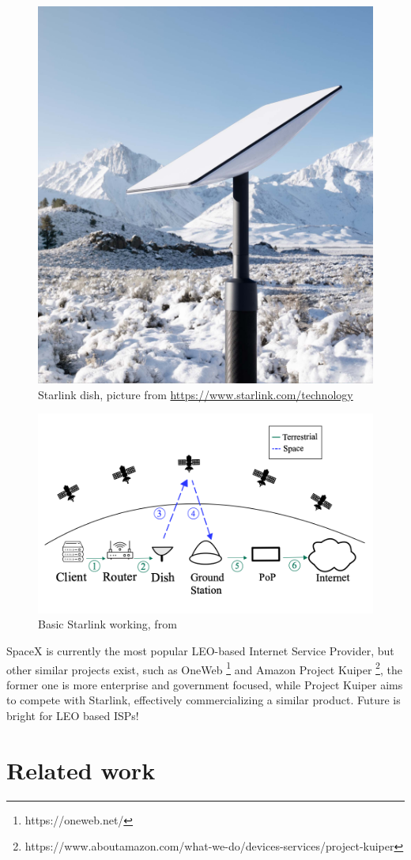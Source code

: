 \documentclass[IN,11pt,twoside,openright,bachelor,english]{tumthesis}
\begin{document}
\begin{figure}
	\centering
	\includegraphics[width=0.6\columnwidth]{img/dish.jpeg}
	\caption{Starlink dish, picture from  \url{https://www.starlink.com/technology}}
	\label{fig:dish}
\end{figure}

\begin{figure}
	\centering
	\includegraphics[width=0.6\columnwidth]{img/starlink-101.png}
	\caption{Basic Starlink working, from \cite{izhikevich2023democratizing}}
	\label{fig:starlink-101}
\end{figure}

SpaceX is currently the most popular LEO-based Internet Service Provider, but other similar projects exist, such as OneWeb \footnote{https://oneweb.net/} and Amazon Project Kuiper \footnote{https://www.aboutamazon.com/what-we-do/devices-services/project-kuiper}, the former one is more enterprise and government focused, while Project Kuiper aims to compete with Starlink, effectively commercializing a similar product. Future is bright for LEO based ISPs!


\section{Related work}
\end{document}
